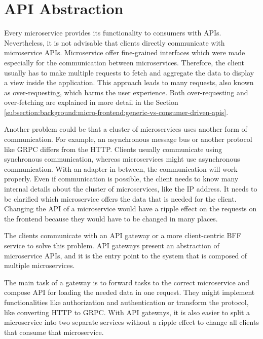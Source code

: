 \section{API Abstraction}\label{section:background:api-abstraction}

Every microservice provides its functionality to consumers with \acp{API}. Nevertheless, it is not advisable that clients directly communicate with microservice \acp{API}. Microservice offer fine-grained interfaces which were made especially for the communication between microservices. Therefore, the client usually has to make multiple requests to fetch and aggregate the data to display a view inside the application. \cite[69]{book:2021:newman:background:bff:micro-services} This approach leads to many requests, also known as over-requesting, which harms the user experience. \cite[254, 257]{book:2018:richardson:background:bff:microservices-patterns} Both over-requesting and over-fetching are explained in more detail in the Section \ref{subsection:background:micro-frontend:generic-vs-consumer-driven-apis}.

\bigskip

\noindent Another problem could be that a cluster of microservices uses another form of communication. For example, an asynchronous message bus or another protocol like \ac{GRPC} differs from the \ac{HTTP}. Clients usually communicate using synchronous communication, whereas microservices might use asynchronous communication. With an adapter in between, the communication will work properly. Even if communication is possible, the client needs to know many internal details about the cluster of microservices, like the \ac{IP} address. It needs to be clarified which microservice offers the data that is needed for the client. Changing the \ac{API} of a microservice would have a ripple effect on the requests on the frontend because they would have to be changed in many places. \cite[254-257]{book:2018:richardson:background:bff:microservices-patterns}

\bigskip

\noindent The clients communicate with an \ac{API} gateway or a more client-centric \ac{BFF} service to solve this problem. \ac{API} gateways present an abstraction of microservice \acp{API}, and it is the entry point to the system that is composed of multiple microservices. \cite[19-20]{book:2020:siriwardena:background:bff:microservice-security-in-action}

\bigskip

\noindent The main task of a gateway is to forward tasks to the correct microservice and compose \ac{API} for loading the needed data in one request. They might implement functionalities like authorization and authentication or transform the protocol, like converting \ac{HTTP} to \ac{GRPC}. With \ac{API} gateways, it is also easier to split a microservice into two separate services without a ripple effect to change all clients that consume that microservice. \cite[260-263]{book:2018:richardson:background:bff:microservices-patterns}

